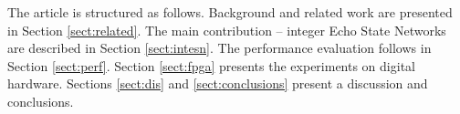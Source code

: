 



The article is structured as follows. Background and related work are presented
in Section \ref{sect:related}. The main contribution -- integer Echo State
Networks are described in Section \ref{sect:intesn}. The performance evaluation
follows in Section \ref{sect:perf}. 
Section \ref{sect:fpga} presents the experiments on digital hardware. 
Sections \ref{sect:dis} and \ref{sect:conclusions}
present a discussion and conclusions.



